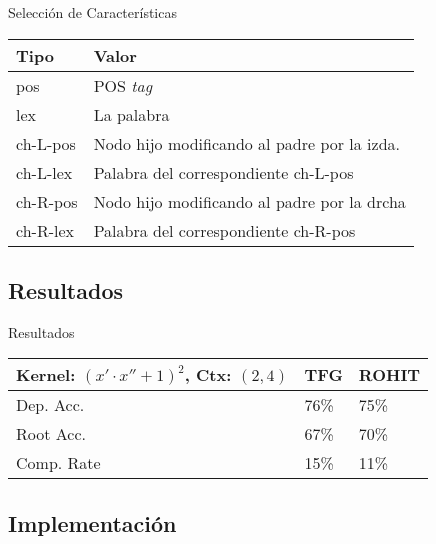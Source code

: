 \documentclass{beamer}
\begin{document}
\begin{frame}{Selección de Características}
  \begin{table}[b!]
    \begin{tabularx}{\textwidth}{lp{}}
      \toprule
      Tipo     & Valor                                                                \\
      \toprule
      pos      & POS \emph{tag}                                                       \\
      lex      & La palabra                                                           \\
      ch-L-pos & Nodo hijo modificando al padre por la izda.                          \\
      ch-L-lex & Palabra del correspondiente ch-L-pos                                 \\
      ch-R-pos & Nodo hijo modificando al padre por la drcha                          \\
      ch-R-lex & Palabra del correspondiente ch-R-pos                                 \\
      \bottomrule
    \end{tabularx}
  \end{table}  
\end{frame}

\subsection{Resultados}

\begin{frame}{Resultados}
  \begin{table}[b!]
    \begin{tabularx}{.82\textwidth}{p{}|p{}p{}}
      Kernel: $(x'\cdot x'' + 1)^2$, Ctx: $(2,4)$ & TFG & ROHIT \\
      \toprule
      Dep. Acc.  & 76\%   & 75\% \\
      Root Acc.  & 67\%   & 70\% \\
      Comp. Rate & 15\%   & 11\% \\
      \bottomrule
    \end{tabularx}
  \end{table}
\end{frame}


\subsection{Implementación}
\end{document}
